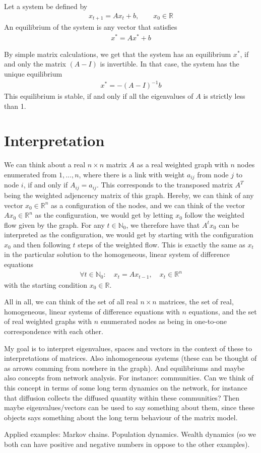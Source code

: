 \documentclass[12pt]{article}
\begin{document}
Let a system be defined by
\begin{align}
x_{t+1} = Ax_t + b, \qquad x_0\in \mathbb{R}
\end{align}
An equilibrium of the system is any vector that satisfies
\begin{align}
x^* = Ax^* + b
\end{align}

By simple matrix calculations, we get that the system has an equilibrium $x^*$, if and only the matrix $(A - I)$ is invertible. In that case, the system has the unique equilibrium
\begin{align}
x^* = -(A-I)^{-1}b
\end{align}
This equilibrium is stable, if and only if all the eigenvalues of $A$ is strictly less than 1.

\section{Interpretation}

We can think about a real $n \times n$ matrix $A$ as a real weighted graph with $n$ nodes enumerated from $1,...,n$, where there is a link with weight $a_{ij}$ from node $j$ to node $i$, if and only if $A_{ij} = a_{ij}$. This corresponds to the transposed matrix $A^T$ being the weighted adjencency matrix of this graph. Hereby, we can think of any vector $x_0\in \mathbb{R}^n$ as a configuration of the nodes, and we can think of the vector $Ax_0 \in \mathbb{R}^n$ as the configuration, we would get by letting $x_0$ follow the weighted flow given by the graph. For any $t \in \mathbb{N}_0$, we therefore have that $A^t x_0$ can be interpreted as the configuration, we would get by starting with the configuration $x_0$ and then following $t$ steps of the weighted flow. This is exactly the same as $x_t$ in the particular solution to the homogeneous, linear system of difference equations
\begin{align}
\forall t\in \mathbb{N}_0: \quad x_t =  Ax_{t-1}, \quad x_t \in \mathbb{R}^n
\end{align}
with the starting condition $x_0\in \mathbb{R}$.

All in all, we can think of the set of all real $n \times n$ matrices, the set of real, homogeneous, linear systems of difference equations with $n$ equations, and the set of real weighted graphs with $n$ enumerated nodes as being in one-to-one correspondence with each other. 

My goal is to interpret eigenvalues, spaces and vectors in the context of these to interpretations of matrices. Also inhomogeneous systems (these can be thought of as arrows comming from nowhere in the graph). And equilibriums and maybe also concepts from network analysis. For instance: communities. Can we think of this concept in terms of some long term dynamics on the network, for instance that diffusion collects the diffused quantity within these communities? Then maybe eigenvalues/vectors can be used to say something about them, since these objects says something about the long term behaviour of the matrix model.

Applied examples: Markov chains. Population dynamics. Wealth dynamics (so we both can have positive and negative numbers in oppose to the other examples).
\end{document}
